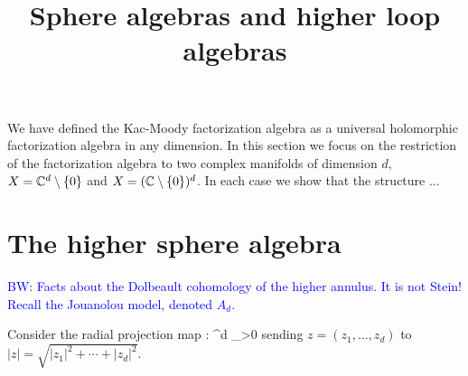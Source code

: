 \documentclass[10pt]{amsart}
\title{Sphere algebras and higher loop algebras}
\def\brian{\textcolor{blue}{BW: }\textcolor{blue}}
\begin{document}
\maketitle

\def\PD{{\rm PD}}
\def\Bar{\overline}

We have defined the Kac-Moody factorization algebra as a universal holomorphic factorization algebra in any dimension. In this section we focus on the restriction of the factorization algebra to two complex manifolds of dimension $d$, $X = \mathbb C^d \setminus \{0\}$ and $X = (\mathbb C \setminus \{0\})^d$. In each case we show that the structure ...

\section{The higher sphere algebra}

\brian{Facts about the Dolbeault cohomology of the higher annulus. It is not Stein! Recall the Jouanolou model, denoted $A_d$.}
%
%
%

Consider the radial projection map
\ben
\rho : \CC^d  \to \RR_{>0}
\een
sending $z = (z_1, \ldots, z_d)$ to $|z| = \sqrt{|z_1|^2 + \cdots + |z_d|^2}$. 
\end{document}
